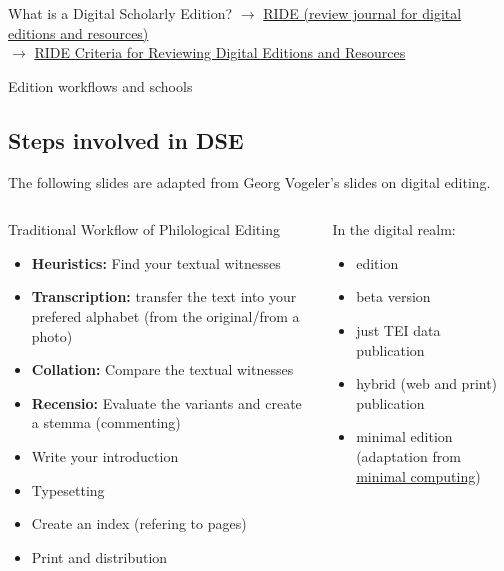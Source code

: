 \begin{frame}[allowframebreaks]{What is a Digital Scholarly Edition?}
$\to$ \href{https://ride.i-d-e.de/}{RIDE (review journal for digital editions and resources)} \\
$\to$ \href{https://ride.i-d-e.de/reviewers/catalogue-criteria-for-reviewing-digital-editions-and-resources/}{RIDE Criteria for Reviewing Digital Editions and Resources}
\end{frame}



\begin{frame}[allowframebreaks]{Edition workflows and schools}
\subsection{Steps involved in DSE}

{\scriptsize
The following slides are adapted from Georg Vogeler's slides on digital editing.
}
\footnotesize
\begin{columns}
\begin{block}{Traditional Workflow of Philological Editing}
\begin{itemize}
    \item \textbf{Heuristics:} Find your textual witnesses
    \item \textbf{Transcription:} transfer the text into your prefered alphabet (from the original/from a photo)
    \item \textbf{Collation:} Compare the textual witnesses
    \item \textbf{Recensio:} Evaluate the variants and create a stemma (commenting)
    \item Write your introduction
    \item Typesetting
    \item Create an index (refering to pages)
    \item Print and distribution
\end{itemize}
\end{block}

\begin{block}{In the digital realm:}
\begin{itemize}
    \item edition 
    \item beta version
    \item just TEI data publication
    \item hybrid (web and print) publication
    \item minimal edition (adaptation from \href{https://go-dh.github.io/mincomp/about}{minimal computing})
\end{itemize}
\end{block}


\end{columns}
\end{frame}

